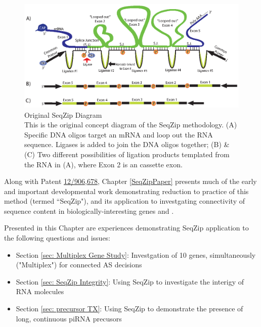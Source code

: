   \begin{figure}[htbp] %
    \centering 
    \includegraphics{Figures/SeqZipMethod/OriginalSeqZipDiagram.eps}
    \caption[Original SeqZip Diagram]
    {
      Original SeqZip Diagram\\
      This is the original concept diagram of the SeqZip methodology. (A) Specific DNA oligos target an mRNA and loop out the RNA sequence. Ligases is added to join the DNA oligos together; (B) \& (C) Two different possibilities of ligation products templated from the RNA in (A), where Exon 2 is an cassette exon.
    	}
    \label{fig:Original SeqZip Diagram}
  	\end{figure}

  Along with Patent \href{http://1.usa.gov/PTG9BB}{12/906,678}, Chapter \ref{SeqZipPaper} presents much of the early and important developmental work demonstrating reduction to practice of this method (termed ``SeqZip"), and its application to investgating connectivity of sequence content in biologically-interesting genes \fn{} and \dscam{}. 

  Presented in this Chapter are experiences demonstrating SeqZip application to the following questions and issues:

  \begin{itemize} %
    \item Section \ref{sec: Multiplex Gene Study}: Investgation of 10 genes, simultaneously ("Multiplex") for connected AS decisions
    \item Section \ref{sec: SeqZip Integrity}: Using SeqZip to investigate the interigy of RNA molecules
     \item Section \ref{sec: precursor TX}: Using SeqZip to demonstrate the presence of long, continuous piRNA precusors
	  \end{itemize}

